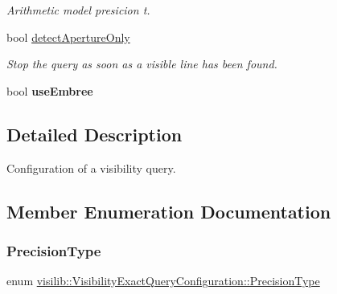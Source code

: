 \begin{DoxyCompactItemize}
\begin{DoxyCompactList}\small\item\em Arithmetic model presicion t. \end{DoxyCompactList}\item 
\mbox{\label{structvisilib_1_1_visibility_exact_query_configuration_aea2fdde8a10663bb824ac5308a42b991}} 
bool \mbox{\hyperlink{structvisilib_1_1_visibility_exact_query_configuration_aea2fdde8a10663bb824ac5308a42b991}{detect\+Aperture\+Only}}
\begin{DoxyCompactList}\small\item\em Stop the query as soon as a visible line has been found. \end{DoxyCompactList}\item 
\mbox{\label{structvisilib_1_1_visibility_exact_query_configuration_a0b70061fa5e2e0a166af938b79e63147}} 
bool {\bfseries use\+Embree}
\end{DoxyCompactItemize}


\subsection{Detailed Description}
Configuration of a visibility query. 

\subsection{Member Enumeration Documentation}
\mbox{\label{structvisilib_1_1_visibility_exact_query_configuration_a1cd44b0dffc3d51eb0bd5af35eeb9a8b}} 
\subsubsection{\texorpdfstring{PrecisionType}{PrecisionType}}
{\footnotesize\ttfamily enum \mbox{\hyperlink{structvisilib_1_1_visibility_exact_query_configuration_a1cd44b0dffc3d51eb0bd5af35eeb9a8b}{visilib\+::\+Visibility\+Exact\+Query\+Configuration\+::\+Precision\+Type}}}



